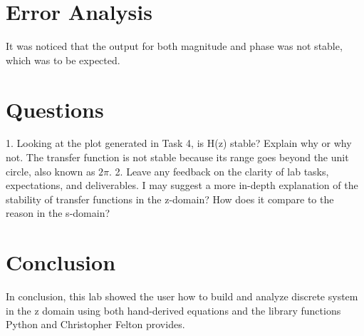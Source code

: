 \documentclass[12pt]{article}
\begin{document}
\section{Error Analysis}
It was noticed that the output for both magnitude and phase was not stable, which was to be expected.

\section{Questions}
1. Looking at the plot generated in Task 4, is H(z) stable? Explain why or why not.\newline
The transfer function is not stable because its range goes beyond the unit circle, also known as $2\pi$.
2. Leave any feedback on the clarity of lab tasks, expectations, and deliverables.\newline
I may suggest a more in-depth explanation of the stability of transfer functions in the z-domain? How does it compare to the reason in the s-domain?


\section{Conclusion}
In conclusion, this lab showed the user how to build and analyze discrete system in the z domain using both hand-derived equations and the library functions Python and Christopher Felton provides.
\end{document}
